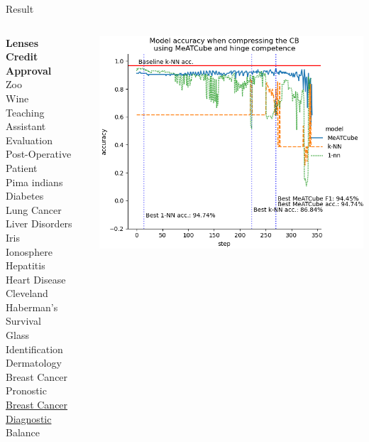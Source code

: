 \documentclass[]{beamer}
\begin{document}
\begin{frame}{Result}
    \begin{columns}
        \begin{column}{.35\textwidth}
            {\smaller\smaller
            \textbf{Lenses} \\
            \textbf{Credit Approval} \\
            Zoo \\
            Wine \\
            Teaching Assistant Evaluation \\
            Post-Operative Patient \\
            Pima indians Diabetes \\
            Lung Cancer \\
            Liver Disorders \\
            Iris \\
            Ionosphere \\
            Hepatitis \\
            Heart Disease Cleveland \\
            Haberman's Survival \\
            Glass Identification \\
            Dermatology \\
            Breast Cancer Pronostic \\
            \underline{Breast Cancer Diagnostic} \\
            Balance\\
            ~}
        \end{column}
        \begin{column}{.65\textwidth}
            \includegraphics[width=.8\textwidth]{../results/figs/breast+cancer+wisconsin+diagnostic.png}

\end{column}
\end{columns}
\end{frame}
\end{document}
